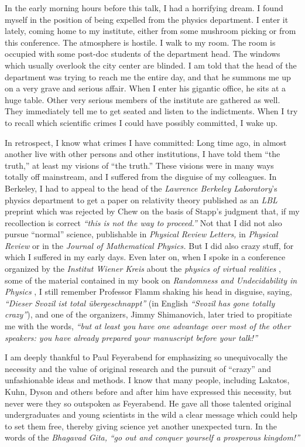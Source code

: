 \documentclass{article}
\begin{document}
In the early morning hours before this talk, I had a horrifying dream.
I found
myself in the position of being expelled from the
physics department.
I enter it lately, coming home to my institute,
either from some mushroom picking or from this conference.
The atmosphere is hostile.
I walk to my room.
The room is occupied with some post-doc students
of the department head.
The windows which usually overlook the city center are blinded.
I am told that the head of the department was trying to reach me the entire day,
and that he summons me up on a very grave and serious affair.
When I enter his gigantic office, he sits at a huge table.
Other very serious members of the institute are gathered as well.
They immediately tell me to get seated and listen to
the indictments.
When I try to recall which scientific crimes I could have possibly committed,
I wake up.

In retrospect, I know what crimes I have committed:
Long time ago, in almost another live with other persons and other institutions,
I have told them ``the truth,''
at least my visions of ``the truth.''
These visions were in many ways totally off mainstream,
and I suffered from the disguise of my colleagues.
In Berkeley, I had to appeal to the head of the {\em Lawrence Berkeley Laboratory}'s
physics department to get a paper on relativity theory published as an {\em LBL} preprint
\cite{svo-83,svo5,svozil-relrel}
which was rejected by Chew on the basis of Stapp's judgment
that, if my recollection is correct {\em ``this is not the way to proceed.''}
Not that I did not also pursue ``normal'' science,
publishable in {\em Physical Review Letters,}
in {\em Physical Review} or in the {\em Journal of Mathematical Physics.}
But I did also crazy stuff, for which I suffered in my early days.
Even later on, when I spoke in a conference organized by the {\em Institut Wiener Kreis}
about the {\em physics of virtual realities}
 \cite{svozil-nat-acad},
 some of the material contained in my book on {\em Randomness and Undecidability in Physics} \cite{svozil-93},
I still remember Professor Flamm shaking his head in disguise, saying,
{\em ``Dieser Svozil ist total \"ubergeschnappt''}
(in English {\em ``Svozil has gone totally crazy''}),
and one of the organizers, Jimmy Shimanovich,  later tried to propitiate me with the words,
{\em ``but at least you have one advantage over most of the other speakers: you have already
prepared your manuscript before your talk!''}


I am deeply thankful to Paul Feyerabend for emphasizing so unequivocally the necessity and the value
of original research and the pursuit of ``crazy'' and unfashionable ideas \cite{dyson-unfash}
and methods.
I know that many people, including Lakatos, Kuhn, Dyson and others before and after him have expressed this
necessity, but never were they so outspoken  as Feyerabend.
He gave all those talented original undergraduates and young scientists in the wild
a clear message which could help to set them free, thereby giving science yet another unexpected turn.
In the words of the {\em Bhagavad Gita,}
{\em ``go out and conquer yourself a prosperous kingdom!''}
\end{document}
